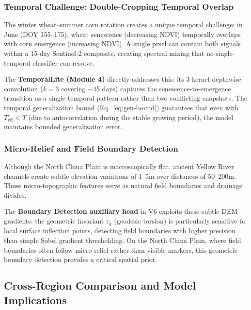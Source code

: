 \subsubsection{Temporal Challenge: Double-Cropping Temporal Overlap}

The winter wheat--summer corn rotation creates a unique temporal challenge:
in June (DOY 155--175), wheat senescence (decreasing NDVI) temporally overlaps
with corn emergence (increasing NDVI). A single pixel can contain both signals
within a 15-day Sentinel-2 composite, creating spectral mixing that no
single-temporal classifier can resolve.

The \textbf{TemporalLite (Module 4)} directly addresses this: its 3-kernel
depthwise convolution ($k=3$ covering $\sim$45 days) captures the
senescence-to-emergence transition as a single temporal pattern rather than
two conflicting snapshots. The temporal generalization bound
(Eq.~\ref{eq:gen-bound}) guarantees that even with $T_{\text{eff}} < T$
(due to autocorrelation during the stable growing period), the model maintains
bounded generalization error.

\subsubsection{Micro-Relief and Field Boundary Detection}

Although the North China Plain is macroscopically flat, ancient Yellow River
channels create subtle elevation variations of 1--5m over distances of
50--200m. These micro-topographic features serve as natural field boundaries
and drainage divides.

The \textbf{Boundary Detection auxiliary head} in V6 exploits these subtle
DEM gradients: the geometric invariant $\tau_g$ (geodesic torsion) is
particularly sensitive to local surface inflection points, detecting field
boundaries with higher precision than simple Sobel gradient thresholding.
On the North China Plain, where field boundaries often follow micro-relief
rather than visible markers, this geometric boundary detection provides a
critical spatial prior.

\subsection{Cross-Region Comparison and Model Implications}

